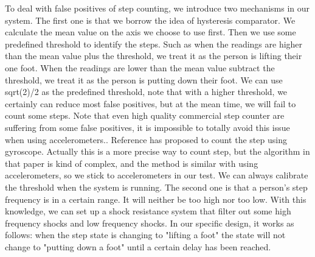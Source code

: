 \documentclass[journal]{IEEEtran}
\begin{document}
To deal with false positives of step counting, we introduce two mechanisms in our system.
The first one is that we borrow the idea of hysteresis comparator.
We calculate the mean value on the axis we choose to use first.
Then we use some predefined threshold to identify the steps.
Such as when the readings are higher than the mean value plus the threshold, we treat it as the person is lifting their one foot.
When the readings are lower than the mean value subtract the threshold, we treat it as the person is putting down their foot.
We can use sqrt(2)/2 as the predefined threshold, note that with a higher threshold, we certainly can reduce most false positives, but at the mean time, we will fail to count some steps.
Note that even high quality commercial step counter are suffering from some false positives, it is impossible to totally avoid this issue when using accelerometers.\cite{Motion Sensor Accuracy}.
Reference \cite{Gyroscope Step Count} has proposed to count the step using gyroscope.
Actually this is a more precise way to count step, but the algorithm in that paper is kind of complex, and the method is similar with using accelerometers, so we stick to accelerometers in our test.
We can always calibrate the threshold when the system is running.
The second one is that a person's step frequency is in a certain range.
It will neither be too high nor too low.
With this knowledge, we can set up a shock resistance system that filter out some high frequency shocks and low frequency shocks.
In our specific design, it works as follows: when the step state is changing to "lifting a foot" the state will not change to "putting down a foot" until a certain delay has been reached.
\end{document}
